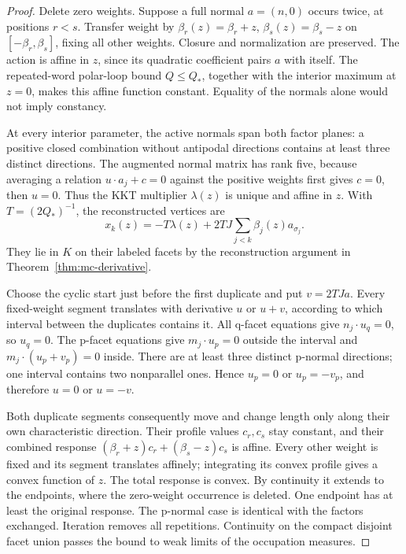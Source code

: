 \begin{proof}
Delete zero weights. Suppose a full normal $a=(n,0)$ occurs twice, at
positions $r<s$. Transfer weight by
$\beta_r(z)=\beta_r+z$, $\beta_s(z)=\beta_s-z$ on
$[-\beta_r,\beta_s]$, fixing all other weights. Closure and normalization
are preserved. The action is affine in $z$, since its quadratic coefficient
pairs $a$ with itself. The repeated-word polar-loop bound $Q\leq Q_*$,
together with the interior maximum at $z=0$, makes this affine function
constant. Equality of the normals alone would not imply constancy.

At every interior parameter, the active normals span both factor planes:
a positive closed combination without antipodal directions contains at least
three distinct directions. The augmented normal matrix has rank five,
because averaging a relation $u\cdot a_j+c=0$ against the positive weights
first gives $c=0$, then $u=0$. Thus the KKT multiplier $\lambda(z)$ is unique
and affine in $z$. With $T=(2Q_*)^{-1}$, the reconstructed vertices are
\[
 x_k(z)=-T\lambda(z)+2TJ\sum_{j<k}\beta_j(z)a_{\sigma_j}.
\]
They lie in $K$ on their labeled facets by the reconstruction argument in
Theorem~\ref{thm:mc-derivative}.

Choose the cyclic start just before the first duplicate and put $v=2TJa$.
Every fixed-weight segment translates with derivative $u$ or $u+v$,
according to which interval between the duplicates contains it. All
q-facet equations give $n_j\cdot u_q=0$, so $u_q=0$. The p-facet equations
give $m_j\cdot u_p=0$ outside the interval and
$m_j\cdot(u_p+v_p)=0$ inside. There are at least three distinct p-normal
directions; one interval contains two nonparallel ones. Hence $u_p=0$ or
$u_p=-v_p$, and therefore $u=0$ or $u=-v$.

Both duplicate segments consequently move and change length only along
their own characteristic direction. Their profile values $c_r,c_s$ stay
constant, and their combined response
$(\beta_r+z)c_r+(\beta_s-z)c_s$ is affine. Every other weight is fixed and
its segment translates affinely; integrating its convex profile gives a
convex function of $z$. The total response is convex. By continuity it
extends to the endpoints, where the zero-weight occurrence is deleted.
One endpoint has at least the original response. The p-normal case is
identical with the factors exchanged. Iteration removes all repetitions.
Continuity on the compact disjoint facet union passes the bound to weak
limits of the occupation measures.
\end{proof}

